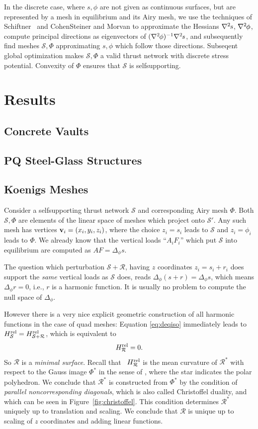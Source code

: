 \documentclass[annual]{acmsiggraph}
\def\rel{{\mathord{\text{\rm rel}}}}
\def\ess{s}
\def\Hess#1{{\def\testess{#1}\nabla^2\ifx\testess\ess\!s\else #1\fi}}
\def\Hess#1{\text{$\nabla^2\hskip-.2ex #1$}}
\def\SS{{\mathcal S}}
\def\RR{{\mathcal R}}
\begin{document}
In the discrete case, where $s,\phi$ are not given as continuous surfaces, 
but are represented by a mesh in equilibrium and its Airy mesh, we use the 
techniques of Schiftner~ and Cohen\dash Steiner 
and Morvan  to approximate the Hessians 
$\Hess s$, $\Hess\phi$, compute principal directions as eigenvectors of 
$(\Hess\phi)^{-1}\Hess s$, and subsequently find meshes $\SS,\Phi$ 
approximating $s,\phi$ which follow those directions. Subseqent global 
optimization makes $\SS,\Phi$ a valid thrust network with discrete stress 
potential. Convexity of $\Phi$ ensures that $\SS$ is self\dash supporting.

\section{Results} \label{sec:results}

\subsection{Concrete Vaults}

\subsection{PQ Steel-Glass Structures}

\subsection{Koenigs Meshes} \label{sec:koenig}

Consider a self\dash supporting thrust network $\SS$ and corresponding 
Airy mesh $\Phi$. Both $\SS,\Phi$ are elements of the linear space of 
meshes which project onto $\SS'$. Any such mesh has vertices 
${\mathbf v}_i=(x_i,y_i,z_i)$, where the choice $z_i=s_i$ leads to $\SS$ and 
$z_i=\phi_i$ leads to $\Phi$. We already know that the vertical loads 
``$A_iF_i$'' which put $\SS$ into equilibrium are computed as 
$AF=\Delta_\phi s$.

The question which perturbation $\SS+\RR$, having $z$ coordinates $z_i = 
s_i+r_i$ does support the {\em same} vertical loads as $\SS$ does, reads 
$\Delta_\phi(s+r)=\Delta_\phi s$, which means $\Delta_\phi r = 0$, i.e., 
$r$ is a harmonic function. It is usually no problem to compute the null 
space of $\Delta_\phi$.

However there is a very nice explicit geometric construction of all 
harmonic functions in the case of quad meshes: Equation \eqref{eq:deqiso} 
immediately leads to $H^\rel_\SS=H^\rel_{\SS+\RR}$, which is equivalent to
	$$
	H^\rel_\RR = 0.
	$$
 So $\RR$ is a {\em minimal surface}. Recall that \ $H^\rel_\RR$ is the 
mean curvature of $\RR^*$ with respect to the Gauss image $\Phi^*$ in the 
sense of \cite{Pottmann2007b}, where the star indicates the polar 
polyhedron. We conclude that $\RR^*$ is constructed from $\Phi^*$ by the 
condition of {\em parallel non\dash corresponding diagonals}, which is 
also called Christoffel duality, and which can be seen in 
Figure~\ref{fig:christoffel}. This condition determines $\RR^*$ uniquely 
up to translation and scaling. We conclude that $\RR$ is unique up to 
scaling of $z$ coordinates and adding linear functions.
\end{document}
